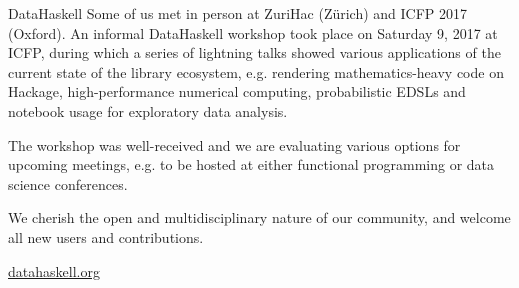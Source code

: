 \documentclass[DIV16,twocolumn,10pt]{scrreprt}
\begin{document}
\begin{hcarentry}{DataHaskell}
Some of us met in person at ZuriHac (Z\"{u}rich) and ICFP 2017 (Oxford). An informal DataHaskell workshop took place on Saturday 9, 2017 at ICFP, during which a series of lightning talks showed various applications of the current state of the library ecosystem, e.g. rendering mathematics-heavy code on Hackage, high-performance numerical computing, probabilistic EDSLs and notebook usage for exploratory data analysis. 

The workshop was well-received and we are evaluating various options for upcoming meetings, e.g. to be hosted at either functional programming or data science conferences.



We cherish the open and multidisciplinary nature of our community, and welcome all new users and contributions.

\FurtherReading
  \url{datahaskell.org}
\end{hcarentry}
\end{document}
